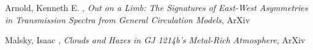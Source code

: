 \item[{\color{numcolor}\scriptsize2}] Arnold, Kenneth E. , \emph{Out on a Limb: The Signatures of East-West Asymmetries in Transmission Spectra from General Circulation Models}, ArXiv

\item[{\color{numcolor}\scriptsize1}] Malsky, Isaac , \emph{Clouds and Hazes in GJ 1214b's Metal-Rich Atmosphere}, ArXiv